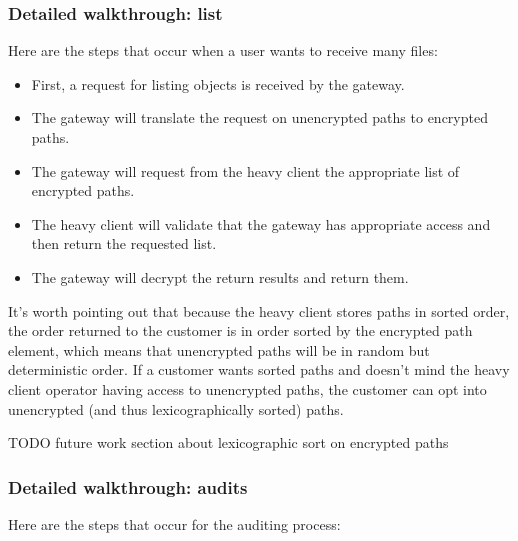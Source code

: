\documentclass[a4paper,10pt]{article} \usepackage[utf8]{inputenc}
\newcommand{\todo}[1]{{\color{red} TODO #1 }}
\begin{document}
\subsubsection{Detailed walkthrough: list}

Here are the steps that occur when a user wants to receive many files:

\begin{itemize}
\item First, a request for listing objects is received by the gateway.
\item The gateway will translate the request on unencrypted paths to encrypted
  paths.
\item The gateway will request from the heavy client the appropriate list of
  encrypted paths.
\item The heavy client will validate that the gateway has appropriate access
  and then return the requested list.
\item The gateway will decrypt the return results and return them.
\end{itemize}

It's worth pointing out that because the heavy client stores paths in sorted
order, the order returned to the customer is in order sorted by the encrypted
path element, which means that unencrypted paths will be in random but
deterministic order. If a customer wants sorted paths and doesn't mind the
heavy client operator having access to unencrypted paths, the customer can opt
into unencrypted (and thus lexicographically sorted) paths.

\todo{future work section about lexicographic sort on encrypted paths}

\subsubsection{Detailed walkthrough: audits}

Here are the steps that occur for the auditing process:
\end{document}
